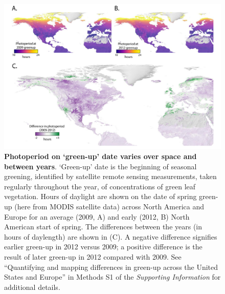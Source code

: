 \documentclass{article}
\begin{document}
 \begin{figure}[h]
\centering
\includegraphics{..//..//docs/photoperiod/figures/Greenup_corr_sm_leg.pdf} %
\caption{\textbf{Photoperiod on `green-up' date varies over space and between years}. `Green-up' date is the beginning of seasonal greening, identified by satellite remote sensing measurements, taken regularly throughout the year, of concentrations of green leaf vegetation. Hours of daylight are shown on the date of spring green-up (here from MODIS satellite data) across North America and Europe for an average (2009, A) and early (2012, B) North American start of spring. The differences between the years (in hours of daylength) are shown in (C). A negative difference signifies earlier green-up in 2012 versus 2009; a positive difference is the result of later green-up in 2012 compared with 2009. See ``Quantifying and mapping differences in green-up across the United States and Europe'' in Methods S1 of the \emph{Supporting Information} for additional details. }%
 \label{fig:greenup}%
 \end{figure}
\end{document}
